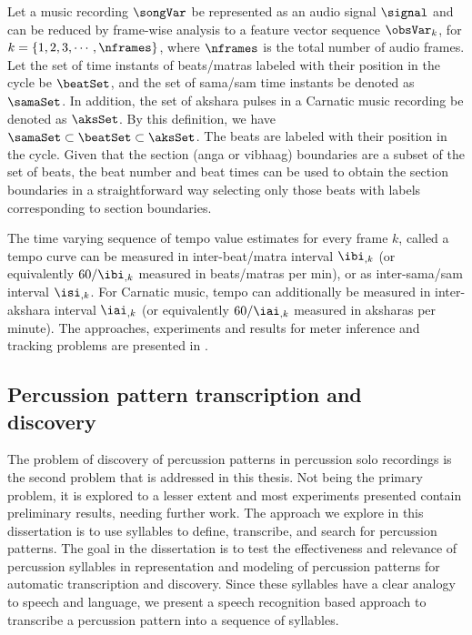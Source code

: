 Let a music recording $\songVar$ be represented as an audio signal $\signal$ and can be reduced by frame-wise analysis to a feature vector sequence $\obsVar_k$, for $k = \{1, 2, 3, \cdots, \nframes\}$, where $\nframes$ is the total number of audio frames. Let the set of time instants of beats/\glspl{matra} labeled with their position in the cycle be $\beatSet$, and the set of \gls{sama}/\gls{sam} time instants be denoted as $\samaSet$. In addition, the set of \gls{akshara} pulses in a Carnatic music recording be denoted as $\aksSet$. By this definition, we have $\samaSet \subset \beatSet \subset \aksSet$. The beats are labeled with their position in the cycle. Given that the section (\gls{anga} or \gls{vibhaag}) boundaries are a subset of the set of beats, the beat number and beat times can be used to obtain the section boundaries in a straightforward way selecting only those beats with labels corresponding to section boundaries.

The time varying sequence of tempo value estimates for every frame $k$, called a tempo curve can be measured in inter-beat/\gls{matra} interval $\ibi_{,k}$ (or equivalently $60/\ibi_{,k}$ measured in beats/\glspl{matra} per min), or as inter-\gls{sama}/\gls{sam} interval $\isi_{,k}$. For Carnatic music, tempo can additionally be measured in inter-\gls{akshara} interval $\iai_{,k}$ (or equivalently $60/\iai_{,k}$ measured in \glspl{akshara} per minute). The approaches, experiments and results for meter inference and tracking problems are presented in . 
%
\subsection[Percussion pattern discovery]{Percussion pattern transcription and\\ discovery}\label{sec:probdef:thesispattern}
The problem of discovery of percussion patterns in percussion solo recordings is the second problem that is addressed in this thesis. Not being the primary problem, it is explored to a lesser extent and most experiments presented contain preliminary results, needing further work. The approach we explore in this dissertation is to use syllables to define, transcribe, and search for percussion patterns. The goal in the dissertation is to test the effectiveness and relevance of percussion syllables in representation and modeling of percussion patterns for automatic transcription and discovery. Since these syllables have a clear analogy to speech and language, we present a speech recognition based approach to transcribe a percussion pattern into a sequence of syllables.

